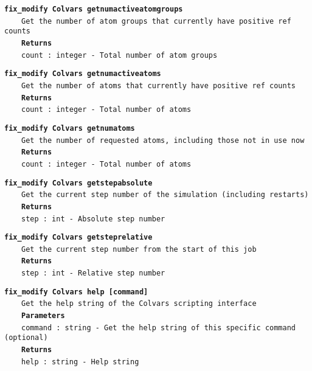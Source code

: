 \begin{mdexampleinput}{}
\texttt{\textbf{fix\_modify Colvars getnumactiveatomgroups}}
\\
\-~~~~\texttt{Get the number of atom groups that currently have positive ref counts}
\\
\-~~~~\texttt{\textbf{Returns}}
\\
\-~~~~\texttt{count : integer - Total number of atom groups}
\end{mdexampleinput}
\begin{mdexampleinput}{}
\texttt{\textbf{fix\_modify Colvars getnumactiveatoms}}
\\
\-~~~~\texttt{Get the number of atoms that currently have positive ref counts}
\\
\-~~~~\texttt{\textbf{Returns}}
\\
\-~~~~\texttt{count : integer - Total number of atoms}
\end{mdexampleinput}
\begin{mdexampleinput}{}
\texttt{\textbf{fix\_modify Colvars getnumatoms}}
\\
\-~~~~\texttt{Get the number of requested atoms, including those not in use now}
\\
\-~~~~\texttt{\textbf{Returns}}
\\
\-~~~~\texttt{count : integer - Total number of atoms}
\end{mdexampleinput}
\begin{mdexampleinput}{}
\texttt{\textbf{fix\_modify Colvars getstepabsolute}}
\\
\-~~~~\texttt{Get the current step number of the simulation (including restarts)}
\\
\-~~~~\texttt{\textbf{Returns}}
\\
\-~~~~\texttt{step : int - Absolute step number}
\end{mdexampleinput}
\begin{mdexampleinput}{}
\texttt{\textbf{fix\_modify Colvars getsteprelative}}
\\
\-~~~~\texttt{Get the current step number from the start of this job}
\\
\-~~~~\texttt{\textbf{Returns}}
\\
\-~~~~\texttt{step : int - Relative step number}
\end{mdexampleinput}
\begin{mdexampleinput}{}
\texttt{\textbf{fix\_modify Colvars help [command]}}
\\
\-~~~~\texttt{Get the help string of the Colvars scripting interface}
\\
\-~~~~\texttt{\textbf{Parameters}}
\\
\-~~~~\texttt{command : string - Get the help string of this specific command (optional)}
\\
\-~~~~\texttt{\textbf{Returns}}
\\
\-~~~~\texttt{help : string - Help string}
\end{mdexampleinput}
